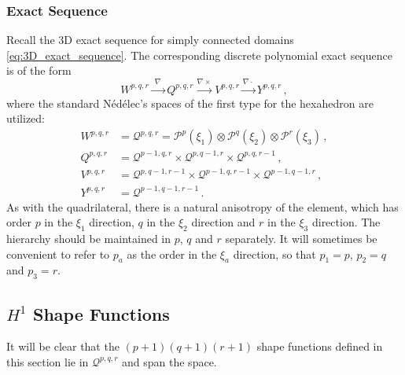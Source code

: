 \subsubsection*{Exact Sequence}

Recall the 3D exact sequence for simply connected domains \eqref{eq:3D_exact_sequence}.
The corresponding discrete polynomial exact sequence is of the form 
\begin{equation}
	W^{p,q,r} \xrightarrow{\,\,\nabla\,\,} Q^{p,q,r} \xrightarrow{\nabla\times} V^{p,q,r} \xrightarrow{\nabla\cdot} Y^{p,q,r} \,,
\end{equation}
where the standard N\'{e}d\'{e}lec's spaces \cite{Nedelec80} of the first type for the hexahedron are utilized:
\begin{equation}
	\begin{aligned}
	W^{p,q,r} & = \mathcal{Q}^{p,q,r}= \mathcal{P}^p(\xi_1)\otimes \mathcal{P}^q (\xi_2)\otimes \mathcal{P}^r (\xi_3)\,,\\
	Q^{p,q,r} & = \mathcal{Q}^{p-1,q,r} \times\mathcal{Q}^{p,q-1,r}\times \mathcal{Q}^{p,q,r-1}\,,\\
	V^{p,q,r} & = \mathcal{Q}^{p,q-1,r-1} \times\mathcal{Q}^{p-1,q,r-1}\times \mathcal{Q}^{p-1,q-1,r}\,,\\
	Y^{p,q,r} & = \mathcal{Q}^{p-1,q-1,r-1}\,.
	\end{aligned}
\end{equation}
As with the quadrilateral, there is a natural anisotropy of the element, which has order $p$ in the $\xi_1$ direction, $q$ in the $\xi_2$ direction and $r$ in the $\xi_3$ direction. 
The hierarchy should be maintained in $p$, $q$ and $r$ separately.  
It will sometimes be convenient to refer to $p_a$ as the order in the $\xi_a$ direction, so that $p_1=p$, $p_2=q$ and $p_3=r$.


\subsection{\texorpdfstring{$H^1$}{H1} Shape Functions}
It will be clear that the $(p+1)(q+1)(r+1)$ shape functions defined in this section lie in $\mathcal{Q}^{p,q,r}$ and span the space.

